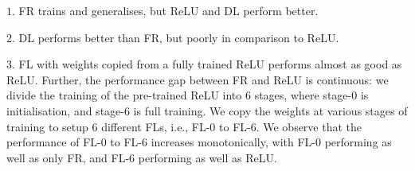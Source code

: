 \documentclass{article}
\begin{document}
$1.$ FR trains and generalises, but ReLU and DL perform better.

$2.$ DL performs better than FR, but poorly in comparison to ReLU.

$3.$ FL with weights copied from a fully trained ReLU performs almost as good as ReLU. Further, the performance gap between FR and ReLU is continuous: we divide the training of the pre-trained ReLU into $6$ stages, where stage-$0$ is initialisation, and stage-$6$ is full training. We copy the weights at various stages of training to setup $6$ different FLs, i.e., FL-$0$ to FL-$6$. We observe that the performance of FL-$0$ to FL-$6$ increases monotonically, with FL-$0$ performing as well as only FR,  and FL-$6$ performing as well as ReLU. 





\end{document}
